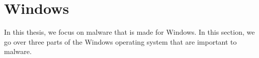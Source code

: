 \section{Windows}
In this thesis, we focus on malware that is made for Windows. In this section, we go over three parts of the Windows operating system that are important to malware.




